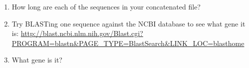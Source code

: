 \documentclass[]{article}
\providecommand{\tightlist}{%
  \setlength{\itemsep}{0pt}\setlength{\parskip}{0pt}}
\begin{document}
\begin{enumerate}
\def\labelenumi{\alph{enumi}.}
\tightlist
\item
  How long are each of the sequences in your concatenated file?
\item
  Try BLASTing one sequence against the NCBI database to see what gene
  it is:
  \url{http://blast.ncbi.nlm.nih.gov/Blast.cgi?PROGRAM=blastn\&PAGE_TYPE=BlastSearch\&LINK_LOC=blasthome}
\item
  What gene is it?
\end{enumerate}
\end{document}
